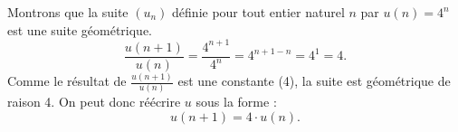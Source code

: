 \documentclass[a4paper,12pt]{article}
\begin{document}
  

  Montrons que la suite $(u_n)$ définie pour tout entier naturel $n$ par $u(n) = 4^n$ est une suite géométrique.
  \[
  \frac{u(n+1)}{u(n)} = \frac{4^{n+1}}{4^n} = 4^{n+1 - n} = 4^1 = 4.
  \]
  Comme le résultat de $\frac{u(n+1)}{u(n)}$ est une constante (4), la suite est géométrique de raison 4. On peut donc réécrire $u$ sous la forme :
  \[
  u(n+1) = 4 \cdot u(n).
  \]
  
\end{document}
